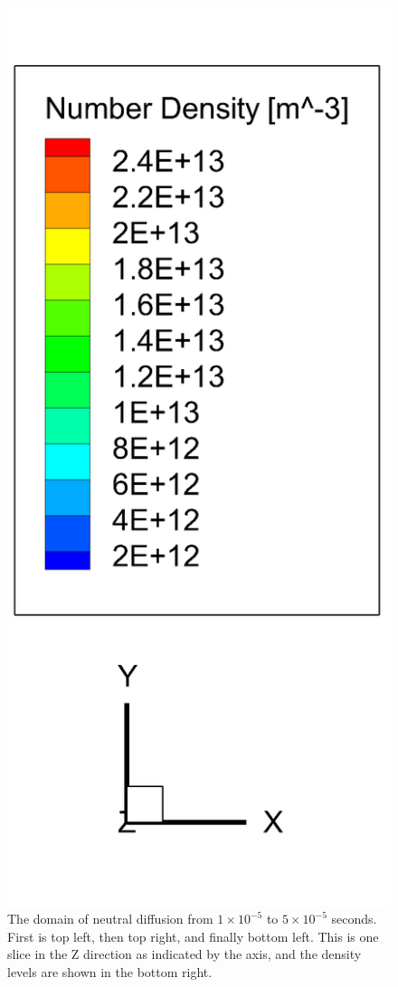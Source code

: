 \begin{figure}
\begin{minipage}[b]{0.2\textwidth}
    \includegraphics[width=\textwidth]{figures/legend.png}
  \end{minipage}
  \caption[Neutral Diffusion Density]{The domain of neutral diffusion from \(1\times10^{-5}\) to \(5\times10^{-5}\) seconds. First is top left, then top right, and finally bottom left. This is one slice in the Z direction as indicated by the axis, and the density levels are shown in the bottom right.}
  \label{fig:neutraldiff}
\end{figure}


